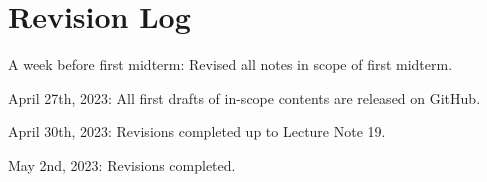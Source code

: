 \chapter{Revision Log}

\begin{bindenum}
    \item A week before first midterm: Revised all notes in scope of first midterm.
    \item April 27th, 2023: All first drafts of in-scope contents are released on GitHub.
    \item April 30th, 2023: Revisions completed up to Lecture Note 19.
    \item May 2nd, 2023: Revisions completed.
\end{bindenum}
